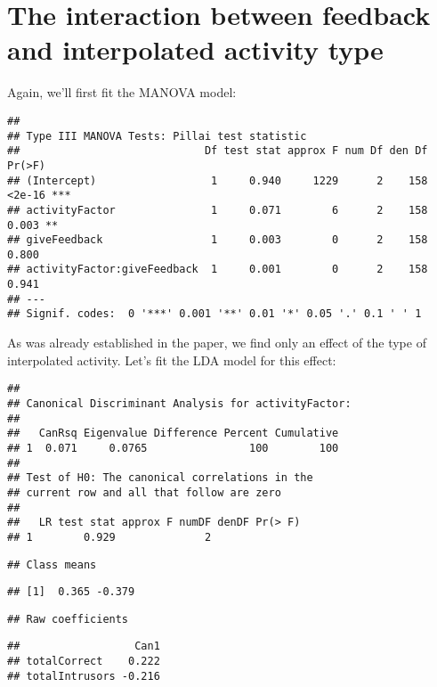 \documentclass[11pt,]{article}
\begin{document}
\hypertarget{the-interaction-between-feedback-and-interpolated-activity-type}{%
\section{The interaction between feedback and interpolated activity
type}\label{the-interaction-between-feedback-and-interpolated-activity-type}}

Again, we'll first fit the MANOVA model:

\begin{verbatim}
## 
## Type III MANOVA Tests: Pillai test statistic
##                             Df test stat approx F num Df den Df Pr(>F)    
## (Intercept)                  1     0.940     1229      2    158 <2e-16 ***
## activityFactor               1     0.071        6      2    158  0.003 ** 
## giveFeedback                 1     0.003        0      2    158  0.800    
## activityFactor:giveFeedback  1     0.001        0      2    158  0.941    
## ---
## Signif. codes:  0 '***' 0.001 '**' 0.01 '*' 0.05 '.' 0.1 ' ' 1
\end{verbatim}

As was already established in the paper, we find only an effect of the
type of interpolated activity. Let's fit the LDA model for this effect:

\begin{verbatim}
## 
## Canonical Discriminant Analysis for activityFactor:
## 
##   CanRsq Eigenvalue Difference Percent Cumulative
## 1  0.071     0.0765                100        100
## 
## Test of H0: The canonical correlations in the 
## current row and all that follow are zero
## 
##   LR test stat approx F numDF denDF Pr(> F)
## 1        0.929              2
\end{verbatim}

\begin{verbatim}
## Class means
\end{verbatim}

\begin{verbatim}
## [1]  0.365 -0.379
\end{verbatim}

\begin{verbatim}
## Raw coefficients
\end{verbatim}

\begin{verbatim}
##                  Can1
## totalCorrect    0.222
## totalIntrusors -0.216
\end{verbatim}
\end{document}

